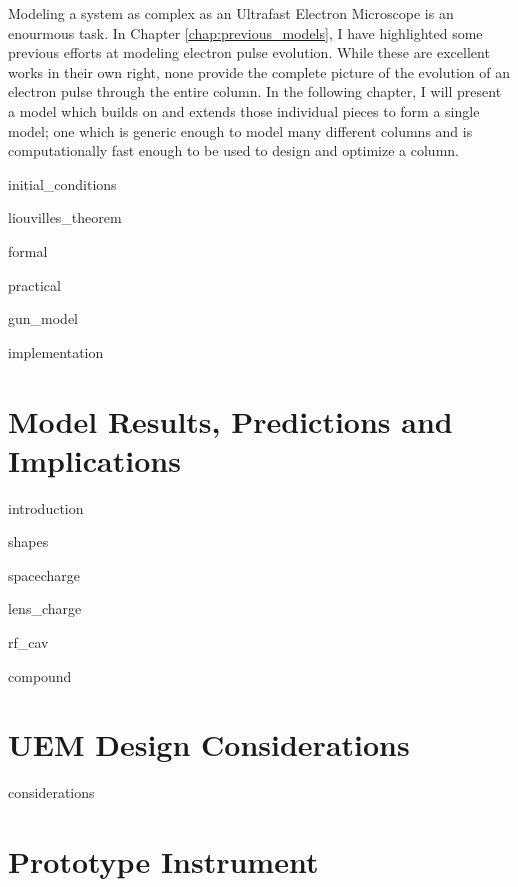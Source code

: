 \documentclass{uicthesi}
\begin{document}
Modeling a system as complex as an Ultrafast Electron Microscope is an enourmous task.
In Chapter \ref{chap:previous_models}, I have highlighted some previous efforts at modeling electron pulse evolution.
While these are excellent works in their own right, none provide the complete picture of the evolution of an electron pulse through the entire column.
In the following chapter, I will present a model which builds on and extends those individual pieces to form a single model; one which is generic enough to model many different columns and is computationally fast enough to be used to design and optimize a column.

  {initial_conditions}

  {liouvilles_theorem}

  {formal}

  {practical}

  {gun_model}

  {implementation}

\chapter{Model Results, Predictions and Implications} \label{chap:model_results}

  {introduction}

  {shapes}

  {spacecharge}

  {lens_charge}

  {rf_cav}

  {compound}

\chapter{UEM Design Considerations} \label{chap:considerations}

  {considerations}

\chapter{Prototype Instrument} \label{chap:prototype}
\end{document}
